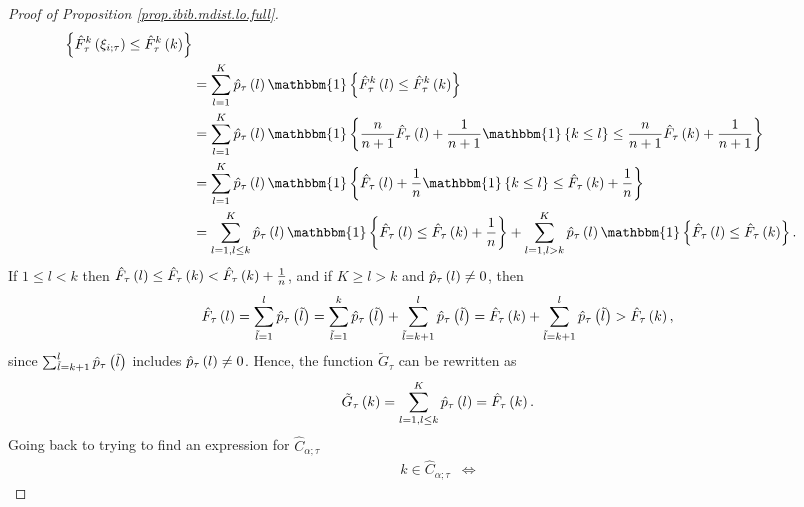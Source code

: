 \documentclass[11pt]{article}
\begin{document}
\begin{proof}[Proof of Proposition \ref{prop.ibib.mdist.lo.full}]
\begin{align*}
    \brac{
        \hat{F}_{\tau}^{k} \paren{\xi_{i; \tau}}
        \leq \hat{F}_{\tau}^{k} \paren{k}
    }
    \\
    &
    =
    \sum_{l=1}^{K}
    \hat{p}_{\tau}\paren{l}
    \mathbbm{1}
    \brac{
        \hat{F}_{\tau}^{k} \paren{l}
        \leq \hat{F}_{\tau}^{k} \paren{k}
    }
    \\
    &
    =
    \sum_{l=1}^{K}
    \hat{p}_{\tau}\paren{l}
    \mathbbm{1}
    \brac{
        \frac{n}{n+1}
        \hat{F}_{\tau}\paren{l}
        + \frac{1}{n+1} \mathbbm{1} \brac{k \leq l}
        \leq
        \frac{n}{n+1} 
        \hat{F}_{\tau}\paren{k}
        + \frac{1}{n+1}
    }
    \\
    &
    =
    \sum_{l=1}^{K}
    \hat{p}_{\tau}\paren{l}
    \mathbbm{1}
    \brac{
        \hat{F}_{\tau}\paren{l}
        + \frac{1}{n} \mathbbm{1} \brac{k \leq l}
        \leq \hat{F}_{\tau}\paren{k}
        + \frac{1}{n}
    }
    \\
    &
    =
    \sum_{l=1, l \leq k}^{K}
    \hat{p}_{\tau}\paren{l}
    \mathbbm{1}
    \brac{
        \hat{F}_{\tau}\paren{l}
        \leq \hat{F}_{\tau}\paren{k}
        + \frac{1}{n}
    }
    +
    \sum_{l=1, l > k}^{K}
    \hat{p}_{\tau}\paren{l}
    \mathbbm{1}
    \brac{
        \hat{F}_{\tau}\paren{l}
        \leq \hat{F}_{\tau}\paren{k}
    }.
\end{align*}
If $1 \leq l < k$ then $\hat{F}_{\tau}\left( l \right) \leq \hat{F}_{\tau}\left( k \right)<\hat{F}_{\tau}\left( k \right) + \frac{1}{n}$,
and if $K \geq l > k$ and $\hat{p}_{\tau} \left( l \right) \neq 0$, then
\begin{align*}
    \hat{F}_{\tau}\left( l \right) = \sum_{\tilde{l}=1}^{l} \hat{p}_{\tau} \left( \tilde{l} \right)
    = \sum_{\tilde{l}=1}^{k} \hat{p}_{\tau} \left( \tilde{l} \right)
    + \sum_{\tilde{l}=k+1}^{l} \hat{p}_{\tau} \left( \tilde{l} \right)
    = \hat{F}_{\tau}\left( k \right) + \sum_{\tilde{l}=k+1}^{l} \hat{p}_{\tau} \left( \tilde{l} \right)
    > \hat{F}_{\tau}\left( k \right),
\end{align*}
since $\sum_{\tilde{l}=k+1}^{l} \hat{p}_{\tau} \left( \tilde{l} \right)$ includes $\hat{p}_{\tau} \left( l \right) \neq 0$.
%
%
%
Hence, the function $\tilde{G}_{\tau}$ can be rewritten as
\begin{align*}
    \tilde{G}_{\tau} \left( k \right) = \sum_{l=1, l \leq k}^{K}
    \hat{p}_{\tau}\left( l \right) = \hat{F}_{\tau} \left( k \right).
\end{align*}
%
%
%
Going back to trying to find an expression for $\hat{C}_{\alpha; \tau}$
\begin{align*}
    k \in \hat{C}_{\alpha; \tau}
    &
    \Longleftrightarrow

\end{align*}
\end{proof}
\end{document}
